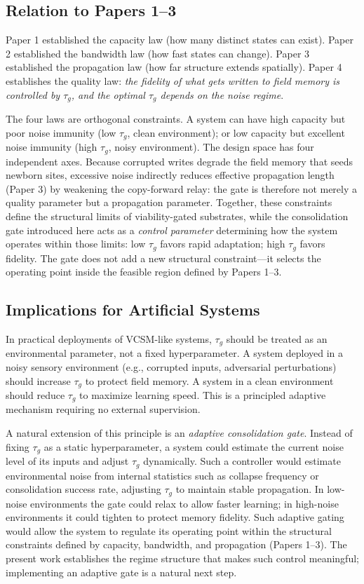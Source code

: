 \documentclass[11pt,twocolumn]{article}
\begin{document}
\subsection{Relation to Papers 1--3}

Paper 1 established the capacity law (how many distinct states can exist).
Paper 2 established the bandwidth law (how fast states can change).
Paper 3 established the propagation law (how far structure extends spatially).
Paper 4 establishes the quality law: \emph{the fidelity of what gets written
to field memory is controlled by $\tau_g$, and the optimal $\tau_g$ depends
on the noise regime}.

The four laws are orthogonal constraints. A system can have high capacity but
poor noise immunity (low $\tau_g$, clean environment); or low capacity but
excellent noise immunity (high $\tau_g$, noisy environment). The design space
has four independent axes.
Because corrupted writes degrade the field memory that seeds newborn sites,
excessive noise indirectly reduces effective propagation length (Paper 3) by
weakening the copy-forward relay: the gate is therefore not merely a quality
parameter but a propagation parameter.
Together, these constraints define the structural limits of viability-gated
substrates, while the consolidation gate introduced here acts as a
\emph{control parameter} determining how the system operates within those
limits: low $\tau_g$ favors rapid adaptation; high $\tau_g$ favors fidelity.
The gate does not add a new structural constraint---it selects the operating
point inside the feasible region defined by Papers 1--3.

\subsection{Implications for Artificial Systems}

In practical deployments of VCSM-like systems, $\tau_g$ should be treated as
an environmental parameter, not a fixed hyperparameter. A system deployed in a
noisy sensory environment (e.g., corrupted inputs, adversarial perturbations)
should increase $\tau_g$ to protect field memory. A system in a clean environment
should reduce $\tau_g$ to maximize learning speed. This is a principled adaptive
mechanism requiring no external supervision.

A natural extension of this principle is an \emph{adaptive consolidation gate}.
Instead of fixing $\tau_g$ as a static hyperparameter, a system could estimate
the current noise level of its inputs and adjust $\tau_g$ dynamically.
Such a controller would estimate environmental noise from internal statistics
such as collapse frequency or consolidation success rate, adjusting $\tau_g$
to maintain stable propagation.
In low-noise environments the gate could relax to allow faster learning;
in high-noise environments it could tighten to protect memory fidelity.
Such adaptive gating would allow the system to regulate its operating point
within the structural constraints defined by capacity, bandwidth, and propagation
(Papers 1--3).
The present work establishes the regime structure that makes such control
meaningful; implementing an adaptive gate is a natural next step.
\end{document}
